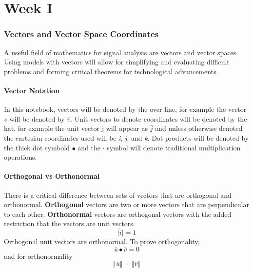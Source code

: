 \documentclass[12pt]{article}
\newcommand{\partcontent}{}
\begin{document}
\part*{Week I}
\renewcommand\partcontent{Week I}
\section{Vectors and Vector Space Coordinates}
A useful field of mathematics for signal analysis are vectors and  vector spaces. Using models with vectors will allow for simplifying and evaluating difficult problems and forming critical theorems for technological advancements.\\

\subsection{Vector Notation}
In this notebook, vectors will be denoted by the over line, for example the vector $v$ will be denoted by  $\overline{v}$. Unit vectors to denote coordinates will be denoted by the hat, for example the unit vector j will appear as $\widehat{j}$ and unless otherwise denoted the cartesian coordinates used will be \textit{i}, \textit{j}, and \textit{k}. Dot products will be denoted by the thick dot symbold $\bullet$ and the $\cdot$ symbol will denote traditional multiplication operations.


\subsection{Orthogonal vs Orthonormal}
There is a critical difference between sets of vectors that are orthogonal and orthonormal. \textbf{Orthogonal} vectors are two or more vectors that are perpendicular to each other. \textbf{Orthonormal} vectors are orthogonal vectors with the added restriction that the vectors are unit vectors. $$\mid \widehat{i} \mid = 1$$ Orthogonal unit vectors are orthonormal. To prove orthogonality, $$\overline{u}\bullet\overline{v} = 0$$ and for orthonormality $$\Vert \overline{u} \Vert = \Vert \overline{v} \Vert$$

\end{document}
